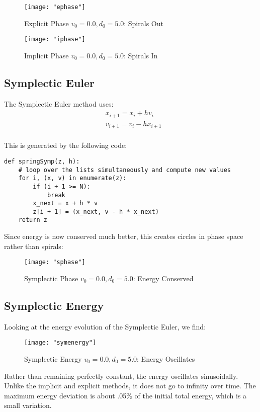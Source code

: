 \documentclass{article}
\begin{document}
\begin{figure}[h!]
	\centering
	\texttt{[image: "ephase"]}
	\caption{Explicit Phase $v_0 = 0.0, d_0 = 5.0$: Spirals Out}
\end{figure} 
\begin{figure}[h!]
	\centering
	\texttt{[image: "iphase"]}
	\caption{Implicit Phase $v_0 = 0.0, d_0 = 5.0$: Spirals In}
\end{figure} 
\FloatBarrier

\subsection{Symplectic Euler}

The Symplectic Euler method uses:
\begin{align*}
	&x_{i+1} = x_i + h v_i\\
	&v_{i+1} = v_i - h x_{i+1}\\
\end{align*}

This is generated by the following code:
\begin{verbatim}
def springSymp(z, h):
    # loop over the lists simultaneously and compute new values
    for i, (x, v) in enumerate(z):
        if (i + 1 >= N):
            break
        x_next = x + h * v
        z[i + 1] = (x_next, v - h * x_next)
    return z
\end{verbatim}

Since energy is now conserved much better, this creates circles in phase space rather than spirals:
\begin{figure}[h!]
	\centering
	\texttt{[image: "sphase"]}
	\caption{Symplectic Phase $v_0 = 0.0, d_0 = 5.0$: Energy Conserved}
\end{figure} 
\FloatBarrier
 
 \subsection{Symplectic Energy}
Looking at the energy evolution of the Symplectic Euler, we find: 
\begin{figure}[h!]
	\centering
	\texttt{[image: "symenergy"]}
	\caption{Symplectic Energy $v_0 = 0.0, d_0 = 5.0$: Energy Oscillates}
\end{figure} 
\FloatBarrier

Rather than remaining perfectly constant, the energy oscillates sinusoidally. Unlike the implicit and explicit methods, it does not go
to infinity over time. The maximum energy deviation is about .05\% of the initial total energy, which is a small variation.
\end{document}
